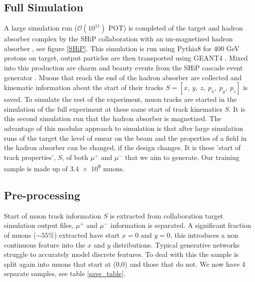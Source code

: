 \documentclass{article}
\begin{document}
    \subsection{Full Simulation}
    
        A large simulation run ($\mathcal{O}(10^{11})$ POT) is completed of the target and hadron absorber complex by the SHiP collaboration with an un-magnetized hadron absorber \cite{ship1504technical}, see figure \ref{SHiP}. This simulation is run using Pythia8 \cite{sjostrand2015introduction} for 400 GeV protons on target, output particles are then transported using GEANT4 \cite{agostinelli2003geant4}. Mixed into this production are charm and beauty events from the SHiP cascade event generator \cite{dijkstra2015heavy}. Muons that reach the end of the hadron absorber are collected and kinematic information about the start of their tracks $S = [x,\:y,\:z,\:p_x,\:p_y,\:p_z]$ is saved. To simulate the rest of the experiment, muon tracks are started in the simulation of the full experiment at these same start of track kinematics $S$. It is this second simulation run that the hadron absorber is magnetized. The advantage of this modular approach to simulation is that after large simulation runs of the target the level of smear on the beam and the properties of a field in the hadron absorber can be changed, if the design changes. It is these 'start of track properties', $S$, of both $\mu^+$ and $\mu^-$ that we aim to generate. Our training sample is made up of \num{3.4e8} muons.
    
    \subsection{Pre-processing}

        Start of muon track information $S$ is extracted from collaboration target simulation output files, $\mu^+$ and $\mu^-$ information is separated. A significant fraction of muons ($\sim55\%$) extracted have start $x = 0$ and $y = 0$, this introduces a non continuous feature into the $x$ and $y$ distributions. Typical generative networks struggle to accurately model discrete features. To deal with this the sample is split again into muons that start at (0,0) and those that do not. We now have 4 separate samples, see table \ref{save_table}.
        
\end{document}
